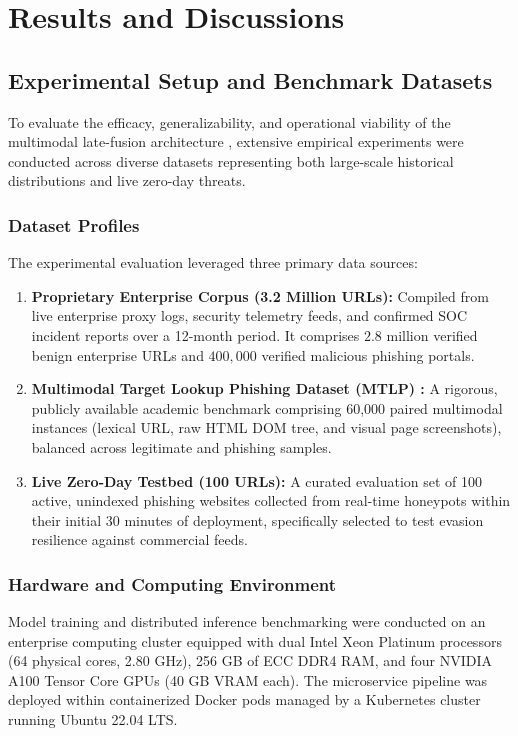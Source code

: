 \chapter{Results and Discussions}

\section{Experimental Setup and Benchmark Datasets}
To evaluate the efficacy, generalizability, and operational viability of the multimodal late-fusion architecture \cite{1}, extensive empirical experiments were conducted across diverse datasets representing both large-scale historical distributions and live zero-day threats.

\subsection{Dataset Profiles}
The experimental evaluation leveraged three primary data sources:
\begin{enumerate}
\item \textbf{Proprietary Enterprise Corpus (3.2 Million URLs):} Compiled from live enterprise proxy logs, security telemetry feeds, and confirmed SOC incident reports over a 12-month period. It comprises $2.8\text{ million}$ verified benign enterprise URLs and $400,000$ verified malicious phishing portals.
\item \textbf{Multimodal Target Lookup Phishing Dataset (MTLP) \cite{5}:} A rigorous, publicly available academic benchmark comprising 60,000 paired multimodal instances (lexical URL, raw HTML DOM tree, and visual page screenshots), balanced across legitimate and phishing samples.
\item \textbf{Live Zero-Day Testbed (100 URLs):} A curated evaluation set of 100 active, unindexed phishing websites collected from real-time honeypots within their initial 30 minutes of deployment, specifically selected to test evasion resilience against commercial feeds.
\end{enumerate}

\subsection{Hardware and Computing Environment}
Model training and distributed inference benchmarking were conducted on an enterprise computing cluster equipped with dual Intel Xeon Platinum processors (64 physical cores, 2.80 GHz), 256 GB of ECC DDR4 RAM, and four NVIDIA A100 Tensor Core GPUs (40 GB VRAM each). The microservice pipeline was deployed within containerized Docker pods managed by a Kubernetes cluster running Ubuntu 22.04 LTS.

